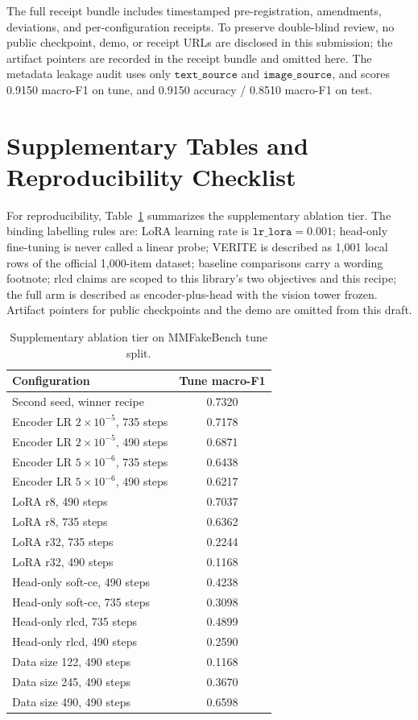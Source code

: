 \documentclass{article} %
\begin{document}
The full receipt bundle includes timestamped pre-registration, amendments, deviations, and per-configuration receipts. To preserve double-blind review, no public checkpoint, demo, or receipt URLs are disclosed in this submission; the artifact pointers are recorded in the receipt bundle and omitted here. The metadata leakage audit uses only \( \texttt{text\_source} \) and \( \texttt{image\_source} \), and scores 0.9150 macro-F1 on tune, and 0.9150 accuracy / 0.8510 macro-F1 on test.

\section{Supplementary Tables and Reproducibility Checklist}
\label{app:tables}
For reproducibility, Table~\ref{tab:ablation} summarizes the supplementary ablation tier. The binding labelling rules are: LoRA learning rate is \( \texttt{lr\_lora}=0.001\); head-only fine-tuning is never called a linear probe; VERITE is described as 1,001 local rows of the official 1,000-item dataset; baseline comparisons carry a wording footnote; rlcd claims are scoped to this library's two objectives and this recipe; the full arm is described as encoder-plus-head with the vision tower frozen. Artifact pointers for public checkpoints and the demo are omitted from this draft.

\begin{table}[t]
\centering
\small
\caption{Supplementary ablation tier on MMFakeBench tune split.}
\label{tab:ablation}
\begin{tabular}{lc}
\toprule
Configuration & Tune macro-F1 \\
\midrule
Second seed, winner recipe & 0.7320 \\
Encoder LR \(2\times10^{-5}\), 735 steps & 0.7178 \\
Encoder LR \(2\times10^{-5}\), 490 steps & 0.6871 \\
Encoder LR \(5\times10^{-6}\), 735 steps & 0.6438 \\
Encoder LR \(5\times10^{-6}\), 490 steps & 0.6217 \\
LoRA r8, 490 steps & 0.7037 \\
LoRA r8, 735 steps & 0.6362 \\
LoRA r32, 735 steps & 0.2244 \\
LoRA r32, 490 steps & 0.1168 \\
Head-only soft-ce, 490 steps & 0.4238 \\
Head-only soft-ce, 735 steps & 0.3098 \\
Head-only rlcd, 735 steps & 0.4899 \\
Head-only rlcd, 490 steps & 0.2590 \\
Data size 122, 490 steps & 0.1168 \\
Data size 245, 490 steps & 0.3670 \\
Data size 490, 490 steps & 0.6598 \\
\bottomrule
\end{tabular}
\end{table}

\end{document}
